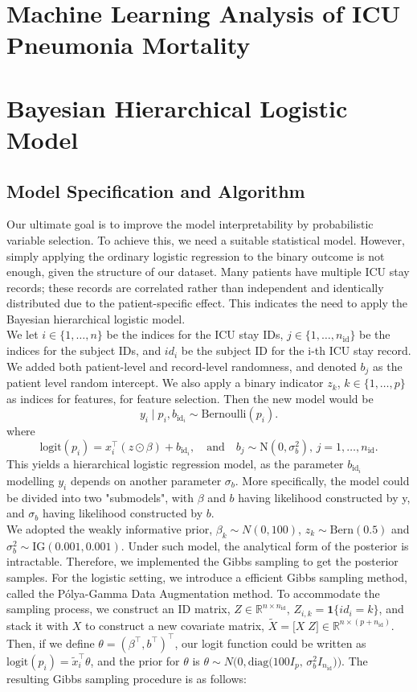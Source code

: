 \documentclass[10pt,a4paper]{article}
\begin{document}
\section{Machine Learning Analysis of ICU Pneumonia Mortality}



\section{Bayesian Hierarchical Logistic Model}
\subsection{Model Specification and Algorithm}
Our ultimate goal is to improve the model interpretability by probabilistic variable selection. To achieve this, we need a suitable statistical model. However, simply applying the ordinary logistic regression to the binary outcome is not enough, given the structure of our dataset. Many patients have multiple ICU stay records; these records are correlated rather than independent and identically distributed due to the patient-specific effect. This indicates the need to apply the Bayesian hierarchical logistic model.\\
We let $i \in \{1,\dots,n\}$ be the indices for the ICU stay IDs, $j\in \{1,\dots,n_{\text{id}}\}$ be the indices for the subject IDs, and $id_i$ be the subject ID for the i-th ICU stay record. We added both patient-level and record-level randomness, and denoted $b_j$ as the patient level random intercept. We also apply a binary indicator $z_k$, $k \in \{1, \dots, p\}$ as indices for features, for feature selection. Then the new model would be
\[
y_i \mid p_i, b_{\mathrm{id}_i} \sim \mathrm{Bernoulli}(p_i).
\]
where
\[
\text{logit}(p_i)
= x_i^\top (z\odot \beta) + b_{\mathrm{id}_i},\quad\text{and}\quad b_j \sim \mathrm{N}(0,\sigma_b^2),\, j=1,\dots,n_{\text{id}}.
\]
This yields a hierarchical logistic regression model, as the parameter $b_{\mathrm{id}_i}$ modelling $y_i$ depends on another parameter $\sigma_b$. More specifically, the model could be divided into two "submodels", with $\beta$ and $b$ having likelihood constructed by y, and $\sigma_b$ having likelihood constructed by $b$.\\
We adopted the weakly informative prior, $\beta_k \sim N(0, 100)$, $z_k \sim \text{Bern}(0.5)$ and $\sigma_b^2 \sim \text{IG}(0.001, 0.001)$. Under such model, the analytical form of the posterior is intractable. Therefore, we implemented the Gibbs sampling to get the posterior samples. For the logistic setting, we introduce a efficient Gibbs sampling method, called the P\'olya-Gamma Data Augmentation method. To accommodate the sampling process, we construct an ID matrix, $Z \in \mathbb{R}^{n\times n_{\mathrm{id}}},\, Z_{i,k} = \mathbf{1}\{id_i = k\}$, and stack it with $X$ to construct a new covariate matrix, $\tilde X = \bigl[X\; Z\bigr] \in \mathbb{R}^{n\times (p+n_{\mathrm{id}})}$. Then, if we define $\theta = (\beta^\top,b^\top)^\top$, our logit function could be written as $\text{logit}(p_i) = \tilde{x}_i^\top \theta$,  and the prior for $\theta$ is $\theta \sim N\bigl(0, \mathrm{diag}\!\bigl(100 I_p,\,\sigma_b^2 I_{n_{\mathrm{id}}}\bigr)\bigr)$. The resulting Gibbs sampling procedure is as follows:
\end{document}
